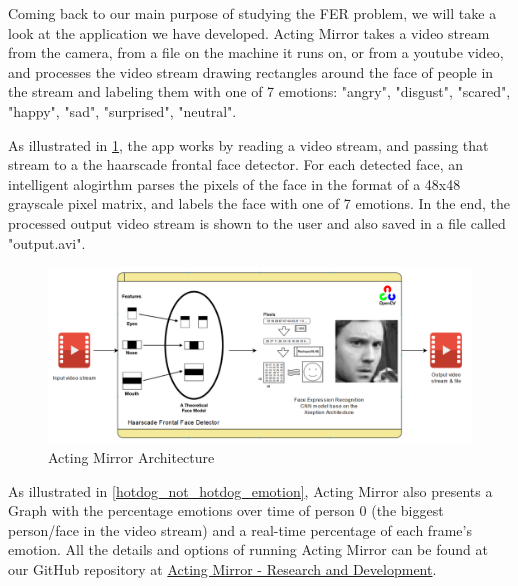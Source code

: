 \documentclass[runningheads,a4paper,11pt]{report}
\begin{document}
Coming back to our main purpose of studying the FER problem, we will take a look at the application we have developed.
Acting Mirror takes a video stream from the camera, from a file on the machine it runs on, or from a youtube video, and processes the video stream drawing rectangles around the face of people in the stream and labeling them with one of 7 emotions: "angry", "disgust", "scared", "happy", "sad", "surprised", "neutral".

As illustrated in \ref{acting_mirror_architecture}, the app works by reading a video stream, and passing that stream to a the haarscade frontal face detector. For each detected face, an intelligent alogirthm parses the pixels of the face in the format of a 48x48 grayscale pixel matrix, and labels the face with one of 7 emotions. In the end, the processed output video stream is shown to the user and also saved in a file called "output.avi". 

\begin{figure}[htbp]
\begin{center}
	\includegraphics[scale=0.57]{Fig/acting_mirror_architecture.pdf}
	\caption{Acting Mirror Architecture}
	\label{acting_mirror_architecture}
\end{center}
\end{figure}

As illustrated in \ref{hotdog_not_hotdog_emotion}, Acting Mirror also presents a Graph with the percentage emotions over time of person 0 (the biggest person/face in the video stream) and a real-time percentage of each frame's emotion. All the details and options of running Acting Mirror can be found at our GitHub repository at \href{https://github.com/bogdanbalanescu/Intelligent-Tools-for-Social-Good}{Acting Mirror - Research and Development}.
\end{document}
